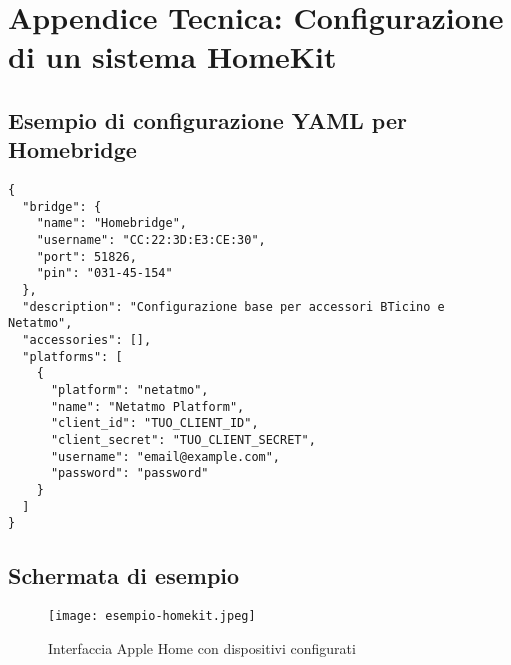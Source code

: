 \chapter{Appendice Tecnica: Configurazione di un sistema HomeKit}
\section*{Esempio di configurazione YAML per Homebridge}
\begin{verbatim}
{
  "bridge": {
    "name": "Homebridge",
    "username": "CC:22:3D:E3:CE:30",
    "port": 51826,
    "pin": "031-45-154"
  },
  "description": "Configurazione base per accessori BTicino e Netatmo",
  "accessories": [],
  "platforms": [
    {
      "platform": "netatmo",
      "name": "Netatmo Platform",
      "client_id": "TUO_CLIENT_ID",
      "client_secret": "TUO_CLIENT_SECRET",
      "username": "email@example.com",
      "password": "password"
    }
  ]
}
\end{verbatim}

\section*{Schermata di esempio}
\begin{figure}[h!]
    \centering
    \texttt{[image: esempio-homekit.jpeg]}
    \caption{Interfaccia Apple Home con dispositivi configurati}
    \label{fig:homekit-interface}
\end{figure}


